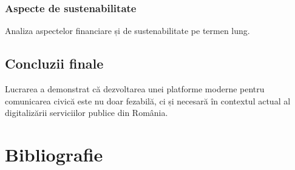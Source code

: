 \documentclass[12pt,a4paper]{report}
\begin{document}
\subsection{Aspecte de sustenabilitate}

Analiza aspectelor financiare și de sustenabilitate pe termen lung.

\section{Concluzii finale}

Lucrarea a demonstrat că dezvoltarea unei platforme moderne pentru comunicarea civică este nu doar fezabilă, ci și necesară în contextul actual al digitalizării serviciilor publice din România.

\newpage
\chapter*{Bibliografie}
\end{document}
